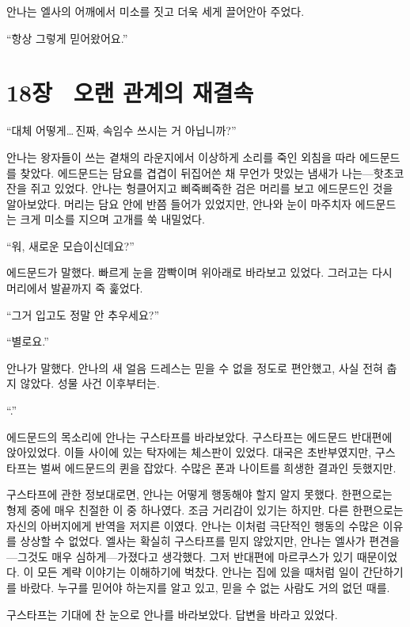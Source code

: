 안나는 엘사의 어깨에서 미소를 짓고 더욱 세게 끌어안아 주었다.

``항상 그렇게 믿어왔어요.''



\chapter[18장  오랜 관계의 재결속][18장\hspace*{.5em}오랜 관계의 재결속]{18장 \ 오랜 관계의 재결속}



\forceindent``대체 어떻게\ldots\,진짜, 속임수 쓰시는 거 아닙니까?''

안나는 왕자들이 쓰는 곁채의 라운지에서 이상하게 소리를 죽인 외침을 따라 에드문드를 찾았다. 에드문드는 담요를 겹겹이 뒤집어쓴 채 무언가 맛있는 냄새가 나는—핫초코 잔을 쥐고 있었다. 안나는 헝클어지고 삐죽삐죽한 검은 머리를 보고 에드문드인 것을 알아보았다. 머리는 담요 안에 반쯤 들어가 있었지만, 안나와 눈이 마주치자 에드문드는 크게 미소를 지으며 고개를 쑥 내밀었다.

``워, 새로운 모습이신데요?''

에드문드가 말했다. 빠르게 눈을 깜빡이며 위아래로 바라보고 있었다. 그러고는 다시 머리에서 발끝까지 죽 훑었다.

``그거 입고도 정말 안 추우세요?''

``별로요.''

안나가 말했다. 안나의 새 얼음 드레스는 믿을 수 없을 정도로 편안했고, 사실 전혀 춥지 않았다. 성물 사건 이후부터는.

``.''

에드문드의 목소리에 안나는 구스타프를 바라보았다. 구스타프는 에드문드 반대편에 앉아있었다. 이들 사이에 있는 탁자에는 체스판이 있었다. 대국은 초반부였지만, 구스타프는 벌써 에드문드의 퀸을 잡았다. 수많은 폰과 나이트를 희생한 결과인 듯했지만.

구스타프에 관한 정보대로면, 안나는 어떻게 행동해야 할지 알지 못했다. 한편으로는 형제 중에 매우 친절한 이 중 하나였다. 조금 거리감이 있기는 하지만. 다른 한편으로는 자신의 아버지에게 반역을 저지른 이였다. 안나는 이처럼 극단적인 행동의 수많은 이유를 상상할 수 없었다. 엘사는 확실히 구스타프를 믿지 않았지만, 안나는 엘사가 편견을—그것도 매우 심하게—가졌다고 생각했다. 그저 반대편에 마르쿠스가 있기 때문이었다. 이 모든 계략 이야기는 이해하기에 벅찼다. 안나는 집에 있을 때처럼 일이 간단하기를 바랐다. 누구를 믿어야 하는지를 알고 있고, 믿을 수 없는 사람도 거의 없던 때를.

구스타프는 기대에 찬 눈으로 안나를 바라보았다. 답변을 바라고 있었다.


